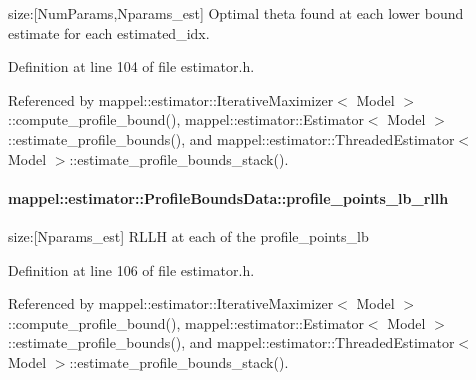 size\+:\mbox{[}Num\+Params,Nparams\+\_\+est\mbox{]} Optimal theta found at each lower bound estimate for each estimated\+\_\+idx. 



Definition at line 104 of file estimator.\+h.



Referenced by mappel\+::estimator\+::\+Iterative\+Maximizer$<$ Model $>$\+::compute\+\_\+profile\+\_\+bound(), mappel\+::estimator\+::\+Estimator$<$ Model $>$\+::estimate\+\_\+profile\+\_\+bounds(), and mappel\+::estimator\+::\+Threaded\+Estimator$<$ Model $>$\+::estimate\+\_\+profile\+\_\+bounds\+\_\+stack().

\paragraph[{\texorpdfstring{profile\+\_\+points\+\_\+lb\+\_\+rllh}{profile_points_lb_rllh}}]{ mappel\+::estimator\+::\+Profile\+Bounds\+Data\+::profile\+\_\+points\+\_\+lb\+\_\+rllh}\hypertarget{structmappel_1_1estimator_1_1ProfileBoundsData_a1b60b8277319ad91eeb193d76c40e8e2}{}\label{structmappel_1_1estimator_1_1ProfileBoundsData_a1b60b8277319ad91eeb193d76c40e8e2}


size\+:\mbox{[}Nparams\+\_\+est\mbox{]} R\+L\+LH at each of the profile\+\_\+points\+\_\+lb 



Definition at line 106 of file estimator.\+h.



Referenced by mappel\+::estimator\+::\+Iterative\+Maximizer$<$ Model $>$\+::compute\+\_\+profile\+\_\+bound(), mappel\+::estimator\+::\+Estimator$<$ Model $>$\+::estimate\+\_\+profile\+\_\+bounds(), and mappel\+::estimator\+::\+Threaded\+Estimator$<$ Model $>$\+::estimate\+\_\+profile\+\_\+bounds\+\_\+stack().

